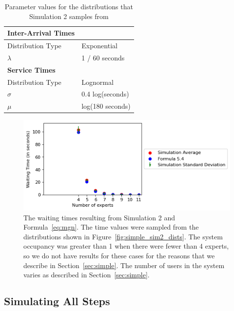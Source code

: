 \begin{table}
  \begin{tabular}{|l|l|}
    \hline
    \textbf{Inter-Arrival Times} & \\
    \hline
    Distribution Type & Exponential\\
    \hline
    $\lambda$ & 1 / 60 seconds\\
    \hline
    \hline
    \textbf{Service Times} & \\
    \hline
    Distribution Type & Lognormal\\
    \hline
    $\sigma$ & 0.4 log(seconds)\\
    \hline
    $\mu$ & log(180 seconds)\\
    \hline
  \end{tabular}
  \caption{
    Parameter values for the distributions that Simulation 2 samples from
  }\label{tab:sim2_params}
  \vspace{-0.5cm}
\end{table}

\begin{figure}[H]
  \includegraphics{figures/montecarlo/independent_calls_lognorm.png}
  \caption[
  The waiting times resulting from Simulation 2 and Formula~\ref{eq:mgn}
  ]{
    The waiting times resulting from Simulation 2 and Formula~\ref{eq:mgn}.
    The time values were sampled from the distributions shown in
    Figure~\ref{fig:simple_sim2_dists}.
    The system occupancy was greater than 1 when there were fewer than 4
    experts, so we do not have results for these cases for the reasons that we
    describe in Section~\ref{sec:simple}.
    The number of users in the system varies as described in
    Section~\ref{sec:simple}.
  }\label{fig:simple_sim2_results}
\end{figure}

\subsection{Simulating All Steps}

